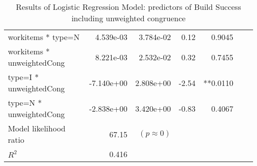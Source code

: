 \begin{table*}
\begin{center}
\begin{tabular}{lrrrrrr}
workitems * type=N         &  4.539e-03  & 3.784e-02  &  0.12   & 0.9045 &              &  \\
workitems * unweightedCong &  8.221e-03  & 2.532e-02  &  0.32   & 0.7455 &              &  \\
type=I * unweightedCong    & -7.140e+00  & 2.808e+00  & -2.54   & **0.0110 &              &  \\
type=N * unweightedCong    & -2.838e+00  & 3.420e+00  & -0.83   & 0.4067 &              &  \\
	\hline
Model likelihood ratio & 67.15 & $(p \approx 0)$ & & & &	 \\
$R^2$ & 0.416 & & & & & \\
	\hline
\end{tabular}
\end{center}
\caption{Results of Logistic Regression Model: predictors of Build Success including unweighted congruence}
\label{tab:logr_unweighted}
\end{table*}
